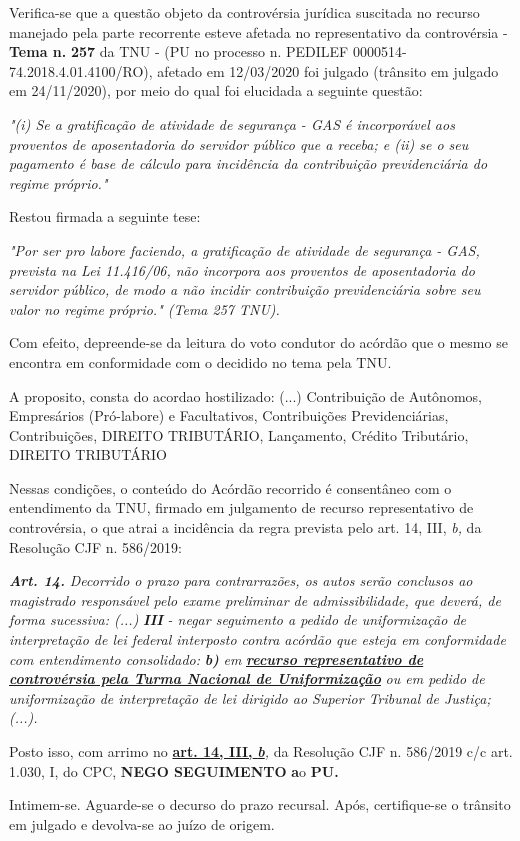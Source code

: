 \documentclass[12pt]{article}
\begin{document}
\justifying
\noindent Verifica-se que a questão objeto da controvérsia jurídica suscitada no recurso manejado pela parte recorrente esteve afetada no representativo da controvérsia - \textbf{Tema n. }\textbf{257} da TNU - (PU no processo n. PEDILEF 0000514-74.2018.4.01.4100/RO),  afetado em 12/03/2020 foi julgado (trânsito em julgado em 24/11/2020), por meio do qual foi elucidada a seguinte questão:

\noindent \textit{"(i) Se a gratificação de atividade de segurança - GAS é incorporável aos proventos de aposentadoria do servidor público que a receba;  e (ii) se o seu pagamento é base de cálculo para incidência da contribuição previdenciária do regime próprio."}

\noindent Restou firmada a seguinte tese:

\noindent \textit{"Por ser pro labore faciendo, a gratificação de atividade de segurança - GAS, prevista na Lei 11.416/06, não incorpora aos proventos de aposentadoria do servidor público, de modo a não incidir contribuição previdenciária sobre seu valor no regime próprio." (Tema 257 TNU).}

\noindent Com efeito, depreende-se da leitura do voto condutor do acórdão que o mesmo se encontra em conformidade com o decidido no  tema pela TNU.

\noindent A proposito, consta do acordao hostilizado: (...) Contribuição de Autônomos, Empresários (Pró-labore) e Facultativos, Contribuições Previdenciárias, Contribuições, DIREITO TRIBUTÁRIO, Lançamento, Crédito Tributário, DIREITO TRIBUTÁRIO

\noindent Nessas condições, o conteúdo do Acórdão recorrido é consentâneo com o entendimento da TNU, firmado em julgamento de recurso representativo de controvérsia, o que atrai a incidência da regra prevista pelo art. 14, III, \textit{b,} da Resolução CJF n. 586/2019:

\noindent \textit{\textbf{Art. 14.}}\textit{ Decorrido o prazo para contrarrazões, os autos serão conclusos ao magistrado responsável pelo exame preliminar de admissibilidade, que deverá, de forma sucessiva: (...) }\textit{\textbf{III }}\textit{- negar seguimento a pedido de uniformização de interpretação de lei federal interposto contra acórdão que esteja em conformidade com entendimento consolidado: }\textit{\textbf{b)}}\textit{ em }\uline{\textit{\textbf{recurso representativo de controvérsia pela Turma Nacional de Uniformização}}}\textit{ ou em pedido de uniformização de interpretação de lei dirigido ao Superior Tribunal de Justiça;(...).}

\noindent Posto isso, com arrimo no \uline{\textbf{art. 14, III, }}\uline{\textit{\textbf{b}}}\textit{,} da Resolução CJF n. 586/2019 c/c art. 1.030, I, do CPC, \textbf{NEGO SEGUIMENTO }\textbf{a}o\textbf{ PU}\textbf{.}

\noindent Intimem-se. Aguarde-se o decurso do prazo recursal. Após, certifique-se o trânsito em julgado e devolva-se ao juízo de origem.
\end{document}
